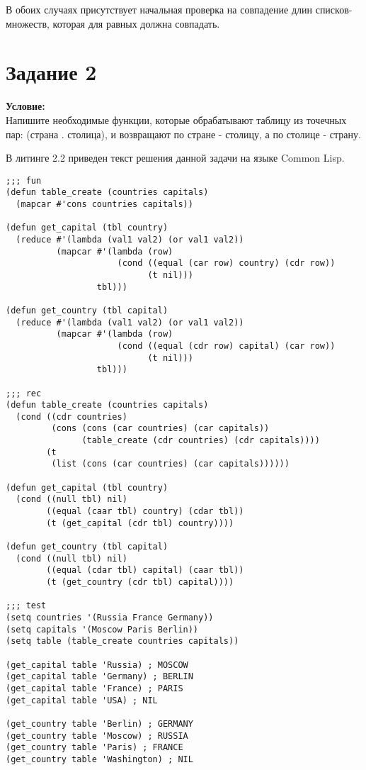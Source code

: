В обоих случаях присутствует начальная проверка на совпадение длин списков-множеств, которая для равных должна совпадать.

\section{Задание \No{}2}
\textbf{Условие:}\\Напишите необходимые функции, которые обрабатывают таблицу из точечных пар: (страна . столица), и возвращают по стране - столицу, а по столице - страну.

В литинге 2.2 приведен текст решения данной задачи на языке Common Lisp.

\begin{lstlisting}[caption={Задание \No{}2}]
;;; fun
(defun table_create (countries capitals)
  (mapcar #'cons countries capitals))

(defun get_capital (tbl country)
  (reduce #'(lambda (val1 val2) (or val1 val2))
          (mapcar #'(lambda (row)
                      (cond ((equal (car row) country) (cdr row))
                            (t nil)))
                  tbl)))

(defun get_country (tbl capital)
  (reduce #'(lambda (val1 val2) (or val1 val2))
          (mapcar #'(lambda (row)
                      (cond ((equal (cdr row) capital) (car row))
                            (t nil)))
                  tbl)))

;;; rec
(defun table_create (countries capitals)
  (cond ((cdr countries)
         (cons (cons (car countries) (car capitals))
               (table_create (cdr countries) (cdr capitals))))
        (t
         (list (cons (car countries) (car capitals))))))

(defun get_capital (tbl country)
  (cond ((null tbl) nil)
        ((equal (caar tbl) country) (cdar tbl))
        (t (get_capital (cdr tbl) country))))

(defun get_country (tbl capital)
  (cond ((null tbl) nil)
        ((equal (cdar tbl) capital) (caar tbl))
        (t (get_country (cdr tbl) capital))))

;;; test
(setq countries '(Russia France Germany))
(setq capitals '(Moscow Paris Berlin))
(setq table (table_create countries capitals))

(get_capital table 'Russia) ; MOSCOW
(get_capital table 'Germany) ; BERLIN
(get_capital table 'France) ; PARIS
(get_capital table 'USA) ; NIL

(get_country table 'Berlin) ; GERMANY
(get_country table 'Moscow) ; RUSSIA
(get_country table 'Paris) ; FRANCE
(get_country table 'Washington) ; NIL
\end{lstlisting}

